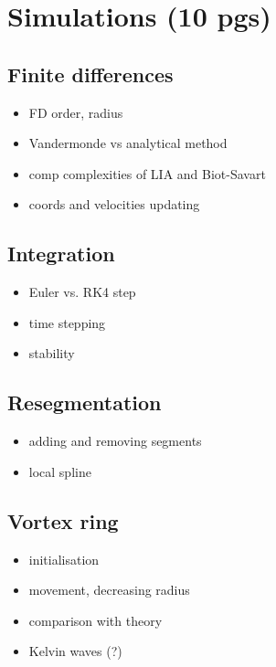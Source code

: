 \chapter{Simulations (10 pgs)}

\section{Finite differences}
\begin{itemize}
	\item FD order, radius
	\item Vandermonde vs analytical method
	\item comp complexities of LIA and Biot-Savart
	\item coords and velocities updating
\end{itemize}

\section{Integration }
\begin{itemize}
	\item Euler vs. RK4 step
	\item time stepping
	\item stability
\end{itemize}

\section{Resegmentation}
\begin{itemize}
	\item adding and removing segments
	\item local spline
\end{itemize}

\section{Vortex ring}
\begin{itemize}
	\item initialisation
	\item movement, decreasing radius
	\item comparison with theory
	\item Kelvin waves (?)
\end{itemize}

\newpage
